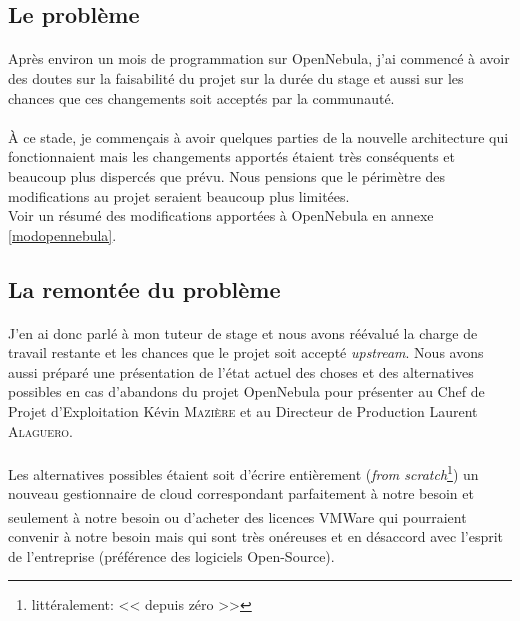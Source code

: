 \subsection{Le problème}

\paragraph*{}
Après environ un mois de programmation sur OpenNebula, j'ai commencé à avoir des doutes sur la faisabilité du projet sur la durée du stage et
aussi sur les chances que ces changements soit acceptés par la communauté.

\paragraph*{}
À ce stade, je commençais à avoir quelques parties de la nouvelle architecture qui fonctionnaient mais les changements apportés étaient très
conséquents et beaucoup plus dispercés que prévu. Nous pensions que le périmètre des modifications au projet seraient beaucoup plus limitées.\\
Voir un résumé des modifications apportées à OpenNebula en annexe \ref{modopennebula}.

\subsection{La remontée du problème}

\paragraph*{}
J'en ai donc parlé à mon tuteur de stage et nous avons réévalué la charge de travail restante et les chances que le projet soit accepté \emph{upstream}.
Nous avons aussi préparé une présentation de l'état actuel des choses et des alternatives possibles en cas d'abandons du projet OpenNebula pour
présenter au Chef de Projet d'Exploitation Kévin \textsc{Mazière} et au Directeur de Production Laurent \textsc{Alaguero}.

\paragraph*{}
Les alternatives possibles étaient soit d'écrire entièrement (\emph{from scratch}\footnote{littéralement: << depuis zéro >>}) un nouveau gestionnaire de
cloud correspondant parfaitement à notre besoin et seulement à notre besoin ou d'acheter des licences VMWare\textsuperscript{\textregistered} qui pourraient
convenir à notre besoin mais qui sont très onéreuses et en désaccord avec l'esprit de l'entreprise (préférence des logiciels Open-Source).

